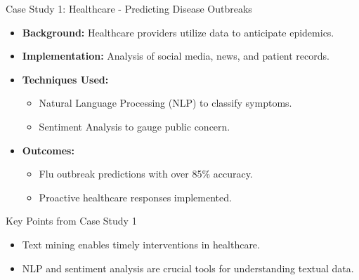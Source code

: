 \documentclass[aspectratio=169]{beamer}
\begin{document}
\begin{frame}[fragile]{Case Study 1: Healthcare - Predicting Disease Outbreaks}
    \begin{itemize}
        \item \textbf{Background:} Healthcare providers utilize data to anticipate epidemics.
        \item \textbf{Implementation:} Analysis of social media, news, and patient records.
        \item \textbf{Techniques Used:} 
        \begin{itemize}
            \item Natural Language Processing (NLP) to classify symptoms.
            \item Sentiment Analysis to gauge public concern.
        \end{itemize}
        \item \textbf{Outcomes:} 
        \begin{itemize}
            \item Flu outbreak predictions with over 85\% accuracy.
            \item Proactive healthcare responses implemented.
        \end{itemize}
    \end{itemize}
\end{frame}

\begin{frame}[fragile]{Key Points from Case Study 1}
    \begin{itemize}
        \item Text mining enables timely interventions in healthcare.
        \item NLP and sentiment analysis are crucial tools for understanding textual data.
    \end{itemize}
\end{frame}
\end{document}

